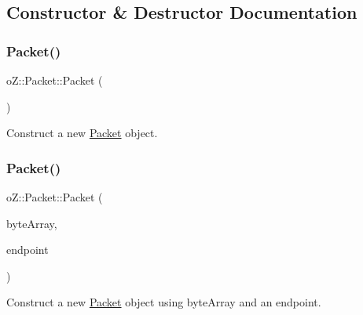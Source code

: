 \subsection{Constructor \& Destructor Documentation}
\mbox{\label{classo_z_1_1_packet_a5c96f8d5db686e035b199e8aeb0e0cea}} 
\subsubsection{\texorpdfstring{Packet()}{Packet()}\hspace{0.1cm}{\footnotesize\ttfamily [1/2]}}
{\footnotesize\ttfamily o\+Z\+::\+Packet\+::\+Packet (\begin{DoxyParamCaption}\item[{void}]{ }\end{DoxyParamCaption})\hspace{0.3cm}{\ttfamily [default]}}



Construct a new \mbox{\hyperlink{classo_z_1_1_packet}{Packet}} object. 

\mbox{\label{classo_z_1_1_packet_a0d77934c04128b52f1dae887ca198051}} 
\subsubsection{\texorpdfstring{Packet()}{Packet()}\hspace{0.1cm}{\footnotesize\ttfamily [2/2]}}
{\footnotesize\ttfamily o\+Z\+::\+Packet\+::\+Packet (\begin{DoxyParamCaption}\item[{\mbox{\hyperlink{namespaceo_z_abfa3f5a46e5c7584615dc1dd33fcafb6}{Byte\+Array}} \&\&}]{byte\+Array,  }\item[{const \mbox{\hyperlink{classo_z_1_1_endpoint}{Endpoint}}}]{endpoint }\end{DoxyParamCaption})\hspace{0.3cm}{\ttfamily [inline]}}



Construct a new \mbox{\hyperlink{classo_z_1_1_packet}{Packet}} object using byte\+Array and an endpoint. 

\mbox{\label{classo_z_1_1_packet_a01d80a0c452b1e07dfd160f494be2af5}} 
